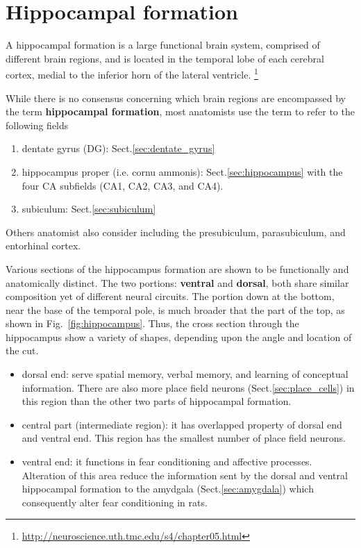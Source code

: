 \section{Hippocampal formation}
\label{sec:hippocampal_formation}

A hippocampal formation is a large functional brain system, comprised of
different brain regions, and is located in the temporal lobe of each cerebral
cortex, medial to the inferior horn of the lateral ventricle.
\footnote{\url{http://neuroscience.uth.tmc.edu/s4/chapter05.html}}

While there is no consensus concerning which brain regions are encompassed by
the term {\bf hippocampal formation}, most anatomists use the term to
refer to the following fields
\begin{enumerate}
  
  \item dentate gyrus (DG): Sect.\ref{sec:dentate_gyrus}

  \item hippocampus proper (i.e. cornu ammonis): Sect.\ref{sec:hippocampus}
  with the four CA subfields (CA1, CA2, CA3, and CA4).
  
  \item subiculum: Sect.\ref{sec:subiculum}
\end{enumerate}
Others anatomist also consider including the presubiculum, parasubiculum,
and entorhinal cortex.

Various sections of the hippocampus formation are shown to be functionally and
anatomically distinct. The two portions: {\bf ventral} and {\bf dorsal}, both
share similar composition yet of different neural circuits. The portion down at
the bottom, near the base of the temporal pole, is much broader that the part of
the top, as shown in Fig.~\ref{fig:hippocampus}. Thus, the cross section through
the hippocampus show a variety of shapes, depending upon the angle and location
of the cut.
\begin{itemize}
  \item dorsal end: serve spatial memory, verbal memory, and learning of
  conceptual information. There are also more place field neurons
  (Sect.\ref{sec:place_cells}) in this region than the other two parts of
  hippocampal formation.
  
  \item central part (intermediate region): it has overlapped property of dorsal
  end and ventral end. This region has the smallest number of place field
  neurons. 
  
  \item ventral end: it functions in fear conditioning and affective processes.
  Alteration of this area reduce the information sent by the dorsal and ventral
  hippocampal formation  to the amydgala (Sect.\ref{sec:amygdala}) which
  consequently alter fear conditioning in rats. 
\end{itemize}


